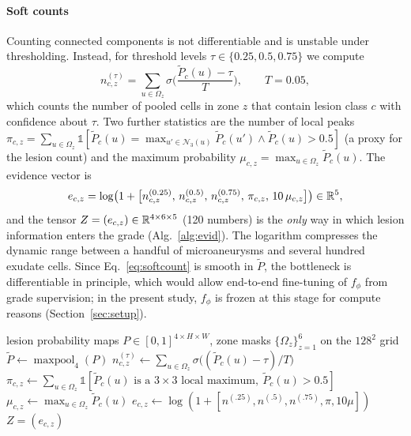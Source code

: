 \paragraph{Soft counts} Counting connected components is not differentiable and is unstable under thresholding. Instead, for threshold levels $\tau\in\{0.25,0.5,0.75\}$ we compute
\begin{equation}
n_{c,z}^{(\tau)}=\sum_{u\in\Omega_z}\sigma\!\Big(\frac{\tilde P_c(u)-\tau}{T}\Big),\qquad T=0.05,
\label{eq:softcount}
\end{equation}
which counts the number of pooled cells in zone $z$ that contain lesion class $c$ with confidence about $\tau$. Two further statistics are the number of local peaks $\pi_{c,z}=\sum_{u\in\Omega_z}\mathbb 1[\tilde P_c(u)=\max_{u'\in\mathcal N_3(u)}\tilde P_c(u')\wedge \tilde P_c(u)>0.5]$ (a proxy for the lesion count) and the maximum probability $\mu_{c,z}=\max_{u\in\Omega_z}\tilde P_c(u)$. The evidence vector is
\begin{equation}
e_{c,z}=\log\!\big(1+\big[n_{c,z}^{(0.25)},\,n_{c,z}^{(0.5)},\,n_{c,z}^{(0.75)},\,\pi_{c,z},\,10\,\mu_{c,z}\big]\big)\in\mathbb{R}^5,
\label{eq:evidence}
\end{equation}
and the tensor $Z=(e_{c,z})\in\mathbb{R}^{4\times6\times5}$ (120 numbers) is the \emph{only} way in which lesion information enters the grade (Alg.~\ref{alg:evid}). The logarithm compresses the dynamic range between a handful of microaneurysms and several hundred exudate cells. Since Eq.~\eqref{eq:softcount} is smooth in $\tilde P$, the bottleneck is differentiable in principle, which would allow end-to-end fine-tuning of $f_\phi$ from grade supervision; in the present study, $f_\phi$ is frozen at this stage for compute reasons (Section~\ref{sec:setup}).

\begin{algorithm}[!htbp]
\caption{Zone-wise soft lesion evidence.}
\label{alg:evid}
\begin{algorithmic}[1]
\Require lesion probability maps $P\in[0,1]^{4\times H\times W}$, zone masks $\{\Omega_z\}_{z=1}^{6}$ on the $128^2$ grid
\State $\tilde P\gets\operatorname{maxpool}_4(P)$
   \State $n^{(\tau)}_{c,z}\gets\sum_{u\in\Omega_z}\sigma\big((\tilde P_c(u)-\tau)/T\big)$ \EndFor
  \State $\pi_{c,z}\gets\sum_{u\in\Omega_z}\mathbb 1[\tilde P_c(u)\text{ is a }3{\times}3\text{ local maximum},\ \tilde P_c(u)>0.5]$
  \State $\mu_{c,z}\gets\max_{u\in\Omega_z}\tilde P_c(u)$
  \State $e_{c,z}\gets\log(1+[n^{(.25)},n^{(.5)},n^{(.75)},\pi,10\mu])$
\EndFor
\State \Return $Z=(e_{c,z})$
\end{algorithmic}
\end{algorithm}

